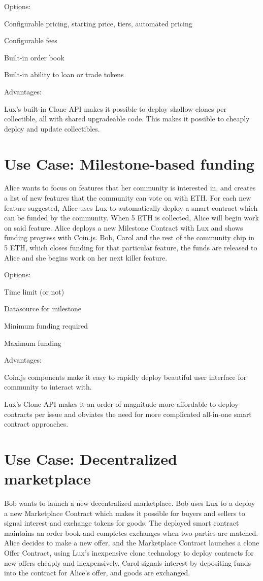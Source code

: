 \documentclass[11pt]{article}
\begin{document}
Options:


Configurable pricing, starting price, tiers, automated pricing


Configurable fees


Built-in order book


Built-in ability to loan or trade tokens


Advantages:


Lux's built-in Clone API makes it possible to deploy shallow clones per collectible, all with shared upgradeable code. This makes it possible to cheaply deploy and update collectibles.


\section{Use Case: Milestone-based funding}

Alice wants to focus on features that her community is interested in, and creates a list of new features that the community can vote on with ETH. For each new feature suggested, Alice uses Lux to automatically deploy a smart contract which can be funded by the community. When 5 ETH is collected, Alice will begin work on said feature. Alice deploys a new Milestone Contract with Lux and shows funding progress with Coin.js. Bob, Carol and the rest of the community chip in 5 ETH, which closes funding for that particular feature, the funds are released to Alice and she begins work on her next killer feature.


Options:


Time limit (or not)


Datasource for milestone


Minimum funding required


Maximum funding


Advantages:


Coin.js components make it easy to rapidly deploy beautiful user interface for community to interact with.


Lux's Clone API makes it an order of magnitude more affordable to deploy contracts per issue and obviates the need for more complicated all-in-one smart contract approaches.


\section{Use Case: Decentralized marketplace}

Bob wants to launch a new decentralized marketplace. Bob uses Lux to a deploy a new Marketplace Contract which makes it possible for buyers and sellers to signal interest and exchange tokens for goods. The deployed smart contract maintains an order book and completes exchanges when two parties are matched. Alice decides to make a new offer, and the Marketplace Contract launches a clone Offer Contract, using Lux's inexpensive clone technology to deploy contracts for new offers cheaply and inexpensively. Carol signals interest by depositing funds into the contract for Alice's offer, and goods are exchanged.
\end{document}
